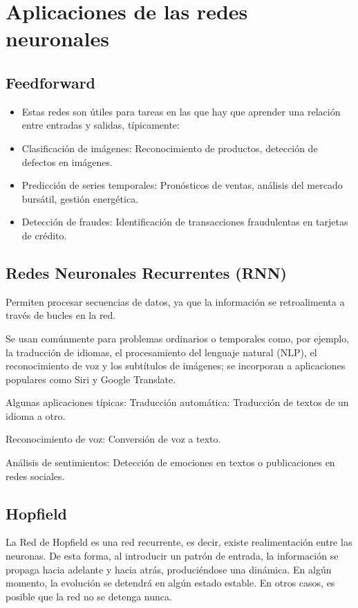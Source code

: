\section{Aplicaciones de las redes neuronales}
\subsection{Feedforward}
\begin{itemize}
    \item Estas redes son útiles para tareas en las que hay que aprender una relación entre entradas y salidas, típicamente:
    \item Clasificación de imágenes: Reconocimiento de productos, detección de defectos en imágenes.
    \item Predicción de series temporales: Pronósticos de ventas, análisis del mercado bursátil, gestión energética.
    \item Detección de fraudes: Identificación de transacciones fraudulentas en tarjetas de crédito.
\end{itemize}
\subsection{Redes Neuronales Recurrentes (RNN)}
Permiten procesar secuencias de datos, ya que la información se retroalimenta a través de bucles en la red.

Se usan comúnmente para problemas ordinarios o temporales como, por ejemplo, la traducción de idiomas, el procesamiento del lenguaje natural (NLP), el reconocimiento de voz y los subtítulos de imágenes; se incorporan a aplicaciones populares como Siri y Google Translate.

Algunas aplicaciones típicas:
Traducción automática: Traducción de textos de un idioma a otro.

Reconocimiento de voz: Conversión de voz a texto.

Análisis de sentimientos: Detección de emociones en textos o publicaciones en redes sociales.
\subsection{Hopfield}
La Red de Hopfield es una red recurrente, es decir, existe realimentación entre las neuronas. De esta forma, al introducir un patrón de entrada, la información se propaga hacia adelante y hacia atrás, produciéndose una dinámica. En algún momento, la evolución se detendrá en algún estado estable. En otros casos, es posible que la red no se detenga nunca.

